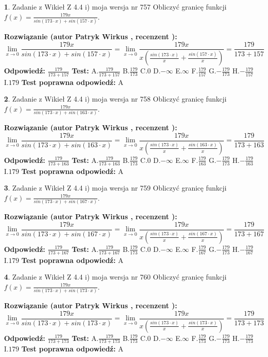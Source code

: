 \documentclass[12pt, a4paper]{article}
\theoremstyle{definition} %
\newtheorem{zad}{}
\newcommand{\zadStart}[1]{\begin{zad}#1\newline}
\newcommand{\zadStop}{\end{zad}}
\newcommand{\rozwStart}[2]{\noindent \textbf{Rozwiązanie (autor #1 , recenzent #2): }\newline}
\newcommand{\rozwStop}{\newline}
\newcommand{\odpStart}{\noindent \textbf{Odpowiedź:}\newline}
\newcommand{\odpStop}{\newline}
\newcommand{\testStart}{\noindent \textbf{Test:}\newline}
\newcommand{\testStop}{\newline}
\newcommand{\kluczStart}{\noindent \textbf{Test poprawna odpowiedź:}\newline}
\newcommand{\kluczStop}{\newline}
\begin{document}
\zadStart{Zadanie z Wikieł Z 4.4 i) moja wersja nr 757}
Obliczyć granicę funkcji $f(x)=\frac{179x}{sin(173\cdot x) +sin(157\cdot x)}$.
\zadStop
\rozwStart{Patryk Wirkus}{}
$$\lim\limits_{x\to 0}\frac{179x}{sin(173\cdot x) +sin(157\cdot x)}=\lim\limits_{x\to 0}\frac{179x}{x(\frac{sin(173\cdot x)}{x}+\frac{sin(157\cdot x)}{x})}=\frac{179}{173+157}$$
\rozwStop
\odpStart
$\frac{179}{173+157}$
\odpStop
\testStart
A.$\frac{179}{173+157}$
B.$\frac{179}{173}$
C.$0$
D.$-\infty$
E.$\infty$
F.$\frac{179}{157}$
G.$-\frac{179}{173}$
H.$-\frac{179}{157}$
I.$179$
\testStop
\kluczStart
A
\kluczStop



\zadStart{Zadanie z Wikieł Z 4.4 i) moja wersja nr 758}
Obliczyć granicę funkcji $f(x)=\frac{179x}{sin(173\cdot x) +sin(163\cdot x)}$.
\zadStop
\rozwStart{Patryk Wirkus}{}
$$\lim\limits_{x\to 0}\frac{179x}{sin(173\cdot x) +sin(163\cdot x)}=\lim\limits_{x\to 0}\frac{179x}{x(\frac{sin(173\cdot x)}{x}+\frac{sin(163\cdot x)}{x})}=\frac{179}{173+163}$$
\rozwStop
\odpStart
$\frac{179}{173+163}$
\odpStop
\testStart
A.$\frac{179}{173+163}$
B.$\frac{179}{173}$
C.$0$
D.$-\infty$
E.$\infty$
F.$\frac{179}{163}$
G.$-\frac{179}{173}$
H.$-\frac{179}{163}$
I.$179$
\testStop
\kluczStart
A
\kluczStop



\zadStart{Zadanie z Wikieł Z 4.4 i) moja wersja nr 759}
Obliczyć granicę funkcji $f(x)=\frac{179x}{sin(173\cdot x) +sin(167\cdot x)}$.
\zadStop
\rozwStart{Patryk Wirkus}{}
$$\lim\limits_{x\to 0}\frac{179x}{sin(173\cdot x) +sin(167\cdot x)}=\lim\limits_{x\to 0}\frac{179x}{x(\frac{sin(173\cdot x)}{x}+\frac{sin(167\cdot x)}{x})}=\frac{179}{173+167}$$
\rozwStop
\odpStart
$\frac{179}{173+167}$
\odpStop
\testStart
A.$\frac{179}{173+167}$
B.$\frac{179}{173}$
C.$0$
D.$-\infty$
E.$\infty$
F.$\frac{179}{167}$
G.$-\frac{179}{173}$
H.$-\frac{179}{167}$
I.$179$
\testStop
\kluczStart
A
\kluczStop



\zadStart{Zadanie z Wikieł Z 4.4 i) moja wersja nr 760}
Obliczyć granicę funkcji $f(x)=\frac{179x}{sin(173\cdot x) +sin(173\cdot x)}$.
\zadStop
\rozwStart{Patryk Wirkus}{}
$$\lim\limits_{x\to 0}\frac{179x}{sin(173\cdot x) +sin(173\cdot x)}=\lim\limits_{x\to 0}\frac{179x}{x(\frac{sin(173\cdot x)}{x}+\frac{sin(173\cdot x)}{x})}=\frac{179}{173+173}$$
\rozwStop
\odpStart
$\frac{179}{173+173}$
\odpStop
\testStart
A.$\frac{179}{173+173}$
B.$\frac{179}{173}$
C.$0$
D.$-\infty$
E.$\infty$
F.$\frac{179}{173}$
G.$-\frac{179}{173}$
H.$-\frac{179}{173}$
I.$179$
\testStop
\kluczStart
A
\kluczStop
\end{document}
